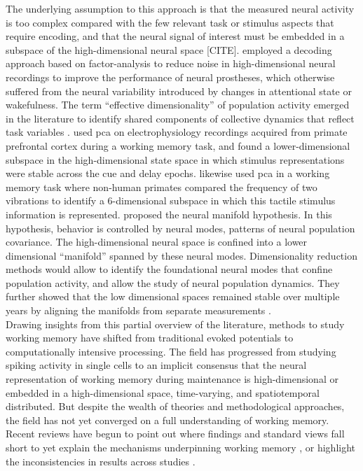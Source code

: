 The underlying assumption to this approach is that the measured neural activity is too complex compared with the few relevant task or stimulus aspects that require encoding, and that the neural signal of interest must be embedded in a subspace of the high-dimensional neural space [CITE].
\citet{santhanam2009factor} employed a decoding approach based on factor-analysis to reduce noise in high-dimensional neural recordings to improve the performance of neural prostheses, which otherwise suffered from the neural variability introduced by changes in attentional state or wakefulness.
The term ``effective dimensionality'' of population activity emerged in the literature to identify shared components of collective dynamics that reflect task variables \citep{jazayeri2021interpreting}.
\citet{murray2017stable} used \gls{pca} on electrophysiology recordings acquired from primate prefrontal cortex during a working memory task, and found a lower-dimensional subspace in the high-dimensional state space in which stimulus representations were stable across the cue and delay epochs.
\citet{machens2010functional} likewise used \gls{pca} in a working memory task where non-human primates compared the frequency of two vibrations to identify a 6-dimensional subspace in which this tactile stimulus information is represented.
\citet{gallego2017neural} proposed the neural manifold hypothesis.
In this hypothesis, behavior is controlled by neural modes, patterns of neural population covariance.
The high-dimensional neural space is confined into a lower dimensional ``manifold'' spanned by these neural modes.
Dimensionality reduction methods would allow to identify the foundational neural modes that confine population activity, and allow the study of neural population dynamics.
They further showed that the low dimensional spaces remained stable over multiple years by aligning the manifolds from separate measurements \citep{gallego2020long}.\\
Drawing insights from this partial overview of the literature, methods to study working memory have shifted from traditional evoked potentials to computationally intensive processing.
The field has progressed from studying spiking activity in single cells to an implicit consensus that the neural representation of working memory during maintenance is high-dimensional or embedded in a high-dimensional space, time-varying, and spatiotemporal distributed.
But despite the wealth of theories and methodological approaches, the field has not yet converged on a full understanding of working memory.
Recent reviews have begun to point out where findings and standard views fall short to yet explain the mechanisms underpinning working memory \citep{nobre2022opening}, or highlight the inconsistencies in results across studies \citep{pavlov2022oscillatory}.
